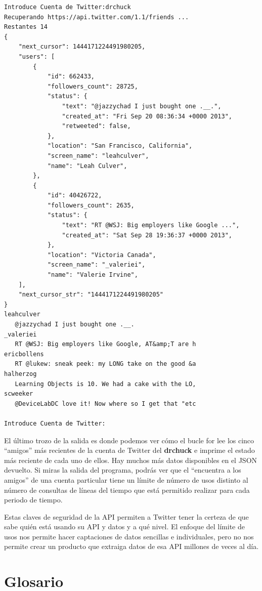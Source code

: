 \beforeverb
\begin{verbatim}
Introduce Cuenta de Twitter:drchuck
Recuperando https://api.twitter.com/1.1/friends ...
Restantes 14
{
    "next_cursor": 1444171224491980205, 
    "users": [
        {
            "id": 662433, 
            "followers_count": 28725, 
            "status": {
                "text": "@jazzychad I just bought one .__.", 
                "created_at": "Fri Sep 20 08:36:34 +0000 2013", 
                "retweeted": false, 
            }, 
            "location": "San Francisco, California", 
            "screen_name": "leahculver", 
            "name": "Leah Culver", 
        }, 
        {
            "id": 40426722, 
            "followers_count": 2635, 
            "status": {
                "text": "RT @WSJ: Big employers like Google ...", 
                "created_at": "Sat Sep 28 19:36:37 +0000 2013", 
            }, 
            "location": "Victoria Canada", 
            "screen_name": "_valeriei", 
            "name": "Valerie Irvine", 
    ], 
    "next_cursor_str": "1444171224491980205"
}
leahculver
   @jazzychad I just bought one .__.
_valeriei
   RT @WSJ: Big employers like Google, AT&amp;T are h
ericbollens
   RT @lukew: sneak peek: my LONG take on the good &a
halherzog
   Learning Objects is 10. We had a cake with the LO,
scweeker
   @DeviceLabDC love it! Now where so I get that "etc

Introduce Cuenta de Twitter:
\end{verbatim}
\afterverb
%
El último trozo de la salida es donde podemos ver cómo el bucle for lee los
cinco ``amigos'' más recientes de la cuenta de Twitter del {\bf drchuck}
e imprime el estado más reciente de cada uno de ellos. Hay
muchos más datos disponibles en el JSON devuelto. Si miras
la salida del programa, podrás ver que el ``encuentra a los amigos''
de una cuenta particular tiene un límite de número de usos distinto al
número de consultas de líneas del tiempo que está permitido realizar para cada periodo de tiempo.

Estas claves de seguridad de la API permiten a Twitter tener la certeza de que
sabe quién está usando su API y datos y a qué nivel. El enfoque del
límite de usos nos permite hacer captaciones de datos sencillas e individuales, pero
no nos permite crear un producto que extraiga datos de esa API
millones de veces al día.

\section{Glosario}

